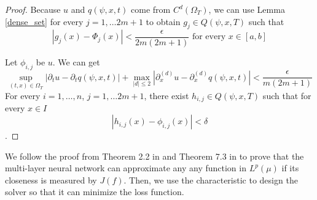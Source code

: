 \documentclass{article}
\begin{document}
\begin{proof}
Because $u$ and $q(\psi,x,t)$ come from $C^{d}(\Omega_{T})$, 
we can use Lemma \ref{dense_set} for every $j = 1, \dots 2m+1$ to obtain $g_{j} \in Q(\psi,x,T)$ such that
\begin{equation}
\left|g_{j}(x)-\Phi_{j}(x)\right|<\frac{\epsilon}{2m(2m+1)} \text{ for every } x \in [a,b]
\end{equation}

	 Let $\phi_{i,j}$ be $u$. We can get
		\begin{equation}
	\sup_{(t,x) \in \Omega_{T}} \left|\partial_{t} u- \partial_{t} q(\psi,x,t)\right| + \max_{|d| \leq 2} \left|\partial_{x}^{(d)} u- \partial_{x}^{(d)} q(\psi,x,t)\right| < \frac{\epsilon}{m(2m+1)}
	\end{equation}
	For every $i=1,\dots,n$, $j=1, \dots 2m+1$, there exist $h_{i,j} \in Q(\psi,x,T)$ such that for every $x \in \textit{I}$
	\[\left|h_{i,j}(x)-\phi_{i,j}(x)\right|<\delta \].



\end{proof}

We follow the proof from Theorem 2.2 in \cite{kurkova} and Theorem 7.3 in \cite{sirignano} to prove that the multi-layer neural network can approximate any any function in $L^{p}(\mu)$ if its closeness is measured by $J(f)$. 
Then, we use the characteristic to design the solver so that it can minimize the loss function. 
\end{document}
